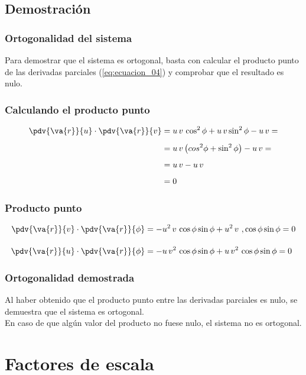 \subsection{Demostración}
\begin{frame}
\frametitle{Ortogonalidad del sistema}
Para demostrar que el sistema es ortogonal, basta con calcular el producto punto de las derivadas parciales (\ref{eq:ecuacion_04}) y comprobar que el resultado es nulo.
\end{frame}
\begin{frame}
\frametitle{Calculando el producto punto}
\begin{align*}
\pdv{\va{r}}{u} \cdot \pdv{\va{r}}{v} &= u \, v \, \cos^{2} \phi + u \, v \sin^{2} \phi - u \, v = \\[0.5em]
&= u \, v \left( cos^{2} \phi + \sin^{2} \phi \right) - u\, v = \\[0.5em]
&= u \, v - u \, v \\[0.5em]
&= 0
\end{align*}
\end{frame}
\begin{frame}
\frametitle{Producto punto}
\begin{align*}
\pdv{\va{r}}{v} \cdot \pdv{\va{r}}{\phi} &= - u^{2} \, v \,  \cos \phi \sin \phi + u^{2} \, v \ ,\cos \phi \sin \phi = 0 \\[1em]
\pdv{\va{r}}{u} \cdot \pdv{\va{r}}{\phi} &= - u \, v^{2} \, \cos \phi \sin \phi + u \, v^{2} \, \cos \phi \sin \phi = 0
\end{align*}
\end{frame}
\begin{frame}
\frametitle{Ortogonalidad demostrada}
Al haber obtenido que el producto punto entre las derivadas parciales es nulo, se demuestra que el sistema es ortogonal.
\\
\bigskip
En caso de que algún valor del producto no fuese nulo, el sistema no es ortogonal.
\end{frame}
\section{Factores de escala}
